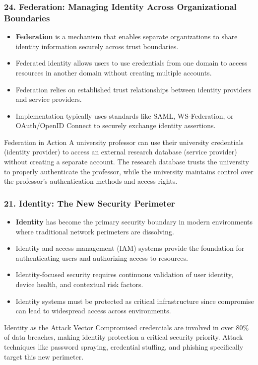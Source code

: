 \documentclass{beamer}
\begin{document}
	\begin{frame}
		\frametitle{24. Federation: Managing Identity Across Organizational Boundaries}
		\begin{itemize}
			\item \textbf{Federation} is a mechanism that enables separate organizations to share identity information securely across trust boundaries.
			\item Federated identity allows users to use credentials from one domain to access resources in another domain without creating multiple accounts.
			\item Federation relies on established trust relationships between identity providers and service providers.
			\item Implementation typically uses standards like SAML, WS-Federation, or OAuth/OpenID Connect to securely exchange identity assertions.
		\end{itemize}
		
		\begin{example}{Federation in Action}
			A university professor can use their university credentials (identity provider) to access an external research database (service provider) without creating a separate account. The research database trusts the university to properly authenticate the professor, while the university maintains control over the professor's authentication methods and access rights.
		\end{example}
	\end{frame}
	
	\begin{frame}
		\frametitle{21. Identity: The New Security Perimeter}
		\begin{itemize}
			\item \textbf{Identity} has become the primary security boundary in modern environments where traditional network perimeters are dissolving.
			\item Identity and access management (IAM) systems provide the foundation for authenticating users and authorizing access to resources.
			\item Identity-focused security requires continuous validation of user identity, device health, and contextual risk factors.
			\item Identity systems must be protected as critical infrastructure since compromise can lead to widespread access across environments.
		\end{itemize}
		
		\begin{alertblock}{Identity as the Attack Vector}
			\scriptsize
			Compromised credentials are involved in over 80\% of data breaches, making identity protection a critical security priority. Attack techniques like password spraying, credential stuffing, and phishing specifically target this new perimeter.
		\end{alertblock}
	\end{frame}
	
\end{document}

